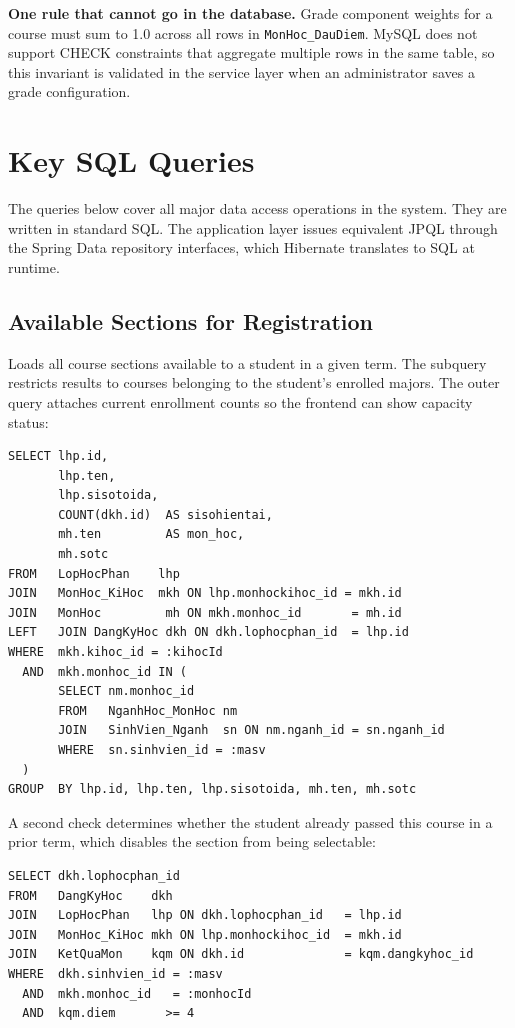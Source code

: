 \documentclass[12pt,a4paper]{report}
\begin{document}
\textbf{One rule that cannot go in the database.} Grade component weights for a course must sum to 1.0 across all rows in \texttt{MonHoc\_DauDiem}. MySQL does not support CHECK constraints that aggregate multiple rows in the same table, so this invariant is validated in the service layer when an administrator saves a grade configuration.

\section{Key SQL Queries}

The queries below cover all major data access operations in the system. They are written in standard SQL. The application layer issues equivalent JPQL through the Spring Data repository interfaces, which Hibernate translates to SQL at runtime.

\subsection{Available Sections for Registration}

Loads all course sections available to a student in a given term. The subquery restricts results to courses belonging to the student's enrolled majors. The outer query attaches current enrollment counts so the frontend can show capacity status:

\begin{verbatim}
SELECT lhp.id,
       lhp.ten,
       lhp.sisotoida,
       COUNT(dkh.id)  AS sisohientai,
       mh.ten         AS mon_hoc,
       mh.sotc
FROM   LopHocPhan    lhp
JOIN   MonHoc_KiHoc  mkh ON lhp.monhockihoc_id = mkh.id
JOIN   MonHoc         mh ON mkh.monhoc_id       = mh.id
LEFT   JOIN DangKyHoc dkh ON dkh.lophocphan_id  = lhp.id
WHERE  mkh.kihoc_id = :kihocId
  AND  mkh.monhoc_id IN (
       SELECT nm.monhoc_id
       FROM   NganhHoc_MonHoc nm
       JOIN   SinhVien_Nganh  sn ON nm.nganh_id = sn.nganh_id
       WHERE  sn.sinhvien_id = :masv
  )
GROUP  BY lhp.id, lhp.ten, lhp.sisotoida, mh.ten, mh.sotc
\end{verbatim}

A second check determines whether the student already passed this course in a prior term, which disables the section from being selectable:

\begin{verbatim}
SELECT dkh.lophocphan_id
FROM   DangKyHoc    dkh
JOIN   LopHocPhan   lhp ON dkh.lophocphan_id   = lhp.id
JOIN   MonHoc_KiHoc mkh ON lhp.monhockihoc_id  = mkh.id
JOIN   KetQuaMon    kqm ON dkh.id              = kqm.dangkyhoc_id
WHERE  dkh.sinhvien_id = :masv
  AND  mkh.monhoc_id   = :monhocId
  AND  kqm.diem       >= 4
\end{verbatim}
\end{document}

